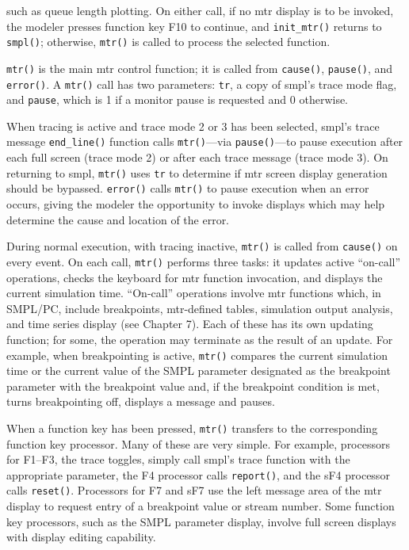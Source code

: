 \noindent such as queue length plotting. On either call, if no mtr display is to be
invoked, the modeler presses function key F10 to continue, and \texttt{init\_mtr()}
returns to \texttt{smpl()}; otherwise, \texttt{mtr()} is called to process the selected
function.

\texttt{mtr()} is the main mtr control function; it is called from \texttt{cause()},
\texttt{pause()}, and \texttt{error()}. A \texttt{mtr()} call has two parameters: \texttt{tr}, a copy of
smpl's trace mode flag, and \texttt{pause}, which is 1 if a monitor pause is requested
and 0 otherwise.

When tracing is active and trace mode 2 or 3 has been selected, smpl's
trace message \texttt{end\_line()} function calls \texttt{mtr()}---via \texttt{pause()}---to pause
execution after each full screen (trace mode 2) or after each trace message
(trace mode 3). On returning to smpl, \texttt{mtr()} uses \texttt{tr} to determine if mtr screen
display generation should be bypassed. \texttt{error()} calls \texttt{mtr()} to pause
execution when an error occurs, giving the modeler the opportunity to invoke
displays which may help determine the cause and location of the error.

During normal execution, with tracing inactive,\newline
\texttt{mtr()} is called from
\texttt{cause()} on every event. On each call, \texttt{mtr()} performs three tasks: it
updates active ``on-call'' operations, checks the keyboard for mtr function
invocation, and displays the current simulation time. ``On-call'' operations
involve mtr functions which, in SMPL/PC, include breakpoints, mtr-defined
tables, simulation output analysis, and time series display (see Chapter 7).
Each of these has its own updating function; for some, the operation may
terminate as the result of an update. For example, when breakpointing is
active, \texttt{mtr()} compares the current simulation time or the current value of
the SMPL parameter designated as the breakpoint parameter with the
breakpoint value and, if the breakpoint condition is met, turns breakpointing
off, displays a message and pauses.

When a function key has been pressed, \texttt{mtr()} transfers to the corresponding
function key processor. Many of these are very simple. For example,
processors for F1--F3, the trace toggles, simply call smpl's trace function with
the appropriate parameter, the F4 processor calls \texttt{report()}, and the sF4
processor calls \texttt{reset()}. Processors for F7 and sF7 use the left message area
of the mtr display to request entry of a breakpoint value or stream number.
Some function key processors, such as the SMPL parameter display, involve
full screen displays with display editing capability.

